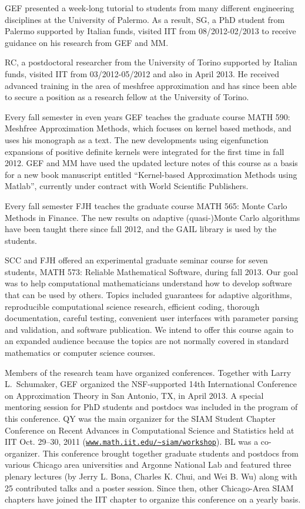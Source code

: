 \documentclass[11pt]{NSFamsart}
\newcommand{\Matlab}{{\sc Matlab}\xspace}
\begin{document}
GEF presented a week-long tutorial to students from many different engineering disciplines at the University of Palermo. As a result, SG, a PhD student from Palermo supported by Italian funds, visited IIT from 08/2012-02/2013 to receive guidance on his research from GEF and MM.

RC, a postdoctoral researcher from the University of Torino supported by Italian funds, visited IIT from 03/2012-05/2012 and also in April 2013. He received advanced training in the area of meshfree approximation and has since been able to secure a position as a research fellow at the University of Torino.

Every fall semester in even years GEF teaches the graduate course MATH 590: Meshfree Approximation Methods, which focuses on kernel based methods, and uses his monograph \citep{Fas07a} as a text. The new developments using eigenfunction expansions of positive definite kernels were integrated for the first time in fall 2012. GEF and MM have used the updated lecture notes of this course as a basis for a new book manuscript entitled ``Kernel-based Approximation Methods using \Matlab'', currently under contract with World Scientific Publishers.

Every fall semester FJH teaches the graduate course MATH 565: Monte Carlo Methods in Finance.  The new results on adaptive (quasi-)Monte Carlo algorithms have been taught there since fall 2012, and the GAIL library is used by the students.

SCC and FJH offered an experimental graduate seminar course for seven students, MATH 573: Reliable Mathematical Software, during fall 2013. Our goal was to help computational mathematicians understand how to develop software that can be used by others.  Topics included guarantees for adaptive algorithms, reproducible computational science research, efficient coding, thorough documentation, careful testing, convenient user interfaces with parameter parsing and validation, and software publication.  We intend to offer this course again to an expanded audience because the topics are not normally covered in standard mathematics or computer science courses.

Members of the research team have organized conferences. Together with Larry L.~Schumaker, GEF organized the NSF-supported 14th International Conference on Approximation Theory in San Antonio, TX, in April 2013. A special mentoring session for PhD students and postdocs was included in the program of this conference. QY was the main organizer for the SIAM Student Chapter Conference on Recent Advances in Computational Science and Statistics held at IIT Oct. 29--30, 2011 (\href{http://www.math.iit.edu/~siam/workshop/}{\nolinkurl{www.math.iit.edu/~siam/workshop}}). BL was a co-organizer. This conference brought together graduate students and postdocs from various Chicago area universities and Argonne National Lab and featured three plenary lectures (by Jerry L. Bona, Charles K. Chui, and Wei B. Wu) along with 25 contributed talks and a poster session. Since then, other Chicago-Area SIAM chapters have joined the IIT chapter to organize this conference on a yearly basis.
\end{document}
